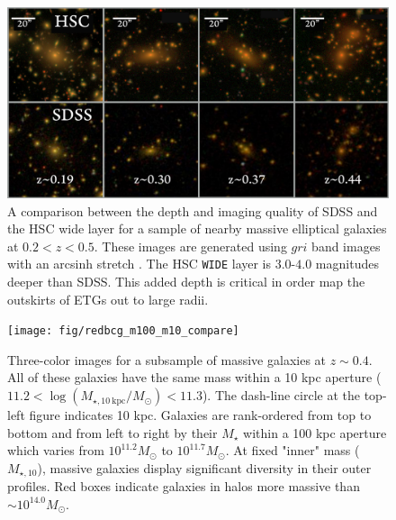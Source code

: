 \documentclass[a4paper,fleqn,usenatbib]{mnras}
\def\mstar{{$M_{\star}$}}
\begin{document}

    \begin{figure}
        \centering 
        \includegraphics[width=\textwidth]{fig/redbcg_sdss_compare}
        \caption{
            A comparison between the depth and imaging quality of SDSS and the HSC wide 
            layer for a sample of nearby massive elliptical galaxies at $0.2 < z < 0.5$.  
            These images are generated using $gri$ band images with an arcsinh stretch 
            \citep{Lupton2004}. 
            The HSC \texttt{WIDE} layer is $3.0$-$4.0$ magnitudes deeper than SDSS.
            This added depth is critical in order map the outskirts of ETGs out to 
            large radii.
            }
        \label{fig:sdss_compare}
    \end{figure}

  \begin{figure}
      \centering 
      \texttt{[image: fig/redbcg\_m100\_m10\_compare]}
      \caption{
          Three-color images for a subsample of massive galaxies at $z\sim 0.4$. 
          All of these galaxies have the same mass within a 10 kpc aperture 
          ($11.2<\log (M_{\star,10\ \mathrm{kpc}}/M_{\odot})<11.3$). 
          The dash-line circle at the top-left figure indicates 10 kpc.
          Galaxies are rank-ordered from top to bottom and from left to right by 
          their \mstar{} within a 100 kpc aperture which varies from $10^{11.2} M_{\odot}$ 
          to $10^{11.7} M_{\odot}$. 
          At fixed "inner" mass ($M_{\star,10}$), massive galaxies display significant
          diversity in their outer profiles. 
          Red boxes indicate galaxies in halos more massive than 
          $\sim 10^{14.0} M_{\odot}$. 
          }
      \label{fig:m100_m10_color}
  \end{figure}
\end{document}
